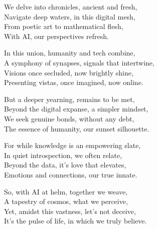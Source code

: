 \documentclass[10pt,letterpaper]{article}
\begin{document}
\begin{center}
We delve into chronicles, ancient and fresh,\\
Navigate deep waters, in this digital mesh,\\
From poetic art to mathematical flesh,\\
With AI, our perspectives refresh.

\bigskip

In this union, humanity and tech combine,\\
A symphony of synapses, signals that intertwine,\\
Visions once secluded, now brightly shine,\\
Presenting vistas, once imagined, now online.

\bigskip

But a deeper yearning, remains to be met,\\
Beyond the digital expanse, a simpler mindset,\\
We seek genuine bonds, without any debt,\\
The essence of humanity, our sunset silhouette.

\bigskip

For while knowledge is an empowering slate,\\
In quiet introspection, we often relate,\\
Beyond the data, it's love that elevates,\\
Emotions and connections, our true innate.

\bigskip

So, with AI at helm, together we weave,\\
A tapestry of cosmos, what we perceive,\\
Yet, amidst this vastness, let's not deceive,\\
It's the pulse of life, in which we truly believe.
\end{center}
\end{document}
